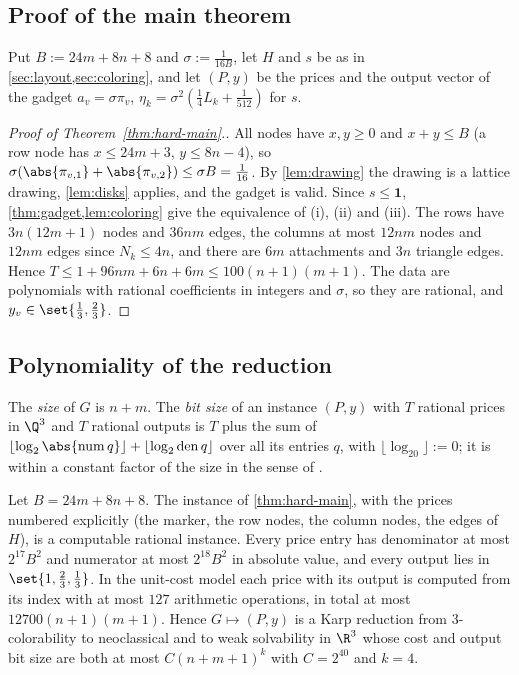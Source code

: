 \subsection{Proof of the main theorem}\label{sec:hard-proof}

Put $B:=24m+8n+8$ and $\sigma:=\frac1{16B}$, let $H$ and $s$ be as in \cref{sec:layout,sec:coloring}, and let $(P,y)$ be the prices and the output vector of the gadget $a_v=\sigma\pi_v$, $\eta_k=\sigma^2(\frac14L_k+\frac1{512})$ for $s$.

\begin{proof}[Proof of Theorem~\ref{thm:hard-main}.]
All nodes have $x,y\ge0$ and $x+y\le B$ (a row node has $x\le24m+3$, $y\le8n-4$), so $\sigma(\abs{\pi_{v,1}}+\abs{\pi_{v,2}})\le\sigma B=\frac1{16}$. By \cref{lem:drawing} the drawing is a lattice drawing, \cref{lem:disks} applies, and the gadget is valid. Since $s\le\mathbf 1$, \cref{thm:gadget,lem:coloring} give the equivalence of (i), (ii) and (iii). The rows have $3n(12m+1)$ nodes and $36nm$ edges, the columns at most $12nm$ nodes and $12nm$ edges since $N_k\le4n$, and there are $6m$ attachments and $3n$ triangle edges. Hence $T\le1+96nm+6n+6m\le100(n+1)(m+1)$. The data are polynomials with rational coefficients in integers and $\sigma$, so they are rational, and $y_v\in\set{\frac13,\frac23}$.
\end{proof}

\subsection{Polynomiality of the reduction}\label{sec:hard-poly}

The \emph{size} of $G$ is $n+m$. The \emph{bit size} of an instance $(P,y)$ with $T$ rational prices in $\Q^3$ and $T$ rational outputs is $T$ plus the sum of $\lfloor\log_2\abs{\mathrm{num}\,q}\rfloor+\lfloor\log_2\mathrm{den}\,q\rfloor$ over all its entries $q$, with $\lfloor\log_20\rfloor:=0$; it is within a constant factor of the size in the sense of \citet[\S2.1]{Schrijver1986}.

\begin{theorem}\label{thm:hard-karp}
Let $B=24m+8n+8$. The instance of \cref{thm:hard-main}, with the prices numbered explicitly (the marker, the row nodes, the column nodes, the edges of $H$), is a computable rational instance. Every price entry has denominator at most $2^{17}B^2$ and numerator at most $2^{18}B^2$ in absolute value, and every output lies in $\set{1,\frac23,\frac13}$. In the unit-cost model each price with its output is computed from its index with at most $127$ arithmetic operations, in total at most $12700(n+1)(m+1)$. Hence $G\mapsto(P,y)$ is a Karp reduction from 3-colorability to neoclassical and to weak solvability in $\R^3$ whose cost and output bit size are both at most $C(n+m+1)^k$ with $C=2^{40}$ and $k=4$.
\end{theorem}

